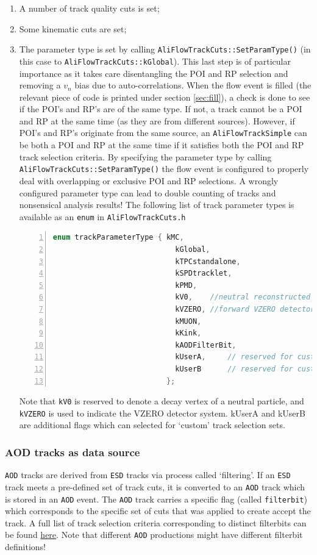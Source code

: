 \documentclass[a4paper]{book}
\numberwithin{equation}{subsection}
\begin{document}
\begin{enumerate}
\item A number of track quality cuts is set;
\item Some kinematic cuts are set;
\item The parameter type is set by calling \texttt{AliFlowTrackCuts::SetParamType()} (in this case to \texttt{AliFlowTrackCuts::kGlobal}). This last step is of particular importance as it takes care disentangling the POI and RP selection and removing a $v_n$ bias due to auto-correlations. When the flow event is filled (the relevant piece of code is printed under section \ref{sec:fill}), a check is done to see if the POI's and RP's are of the same type. If not, a track cannot be a POI and RP at the same time (as they are from different sources). However, if POI's and RP's originate from the same source, an \texttt{AliFlowTrackSimple} can be both a POI and RP at the same time if it satisfies both the POI and RP track selection criteria. By specifying the parameter type by calling \texttt{AliFlowTrackCuts::SetParamType()} the flow event is configured to properly deal with overlapping or exclusive POI and RP selections. A wrongly configured parameter type can lead to double counting of tracks and nonsensical analysis results! The following list of track parameter types is available as an \texttt{enum} in \texttt{AliFlowTrackCuts.h}
\begin{lstlisting}[language=C, numbers=left]
  enum trackParameterType { kMC, 
                            kGlobal, 
                            kTPCstandalone, 
                            kSPDtracklet,
                            kPMD,
                            kV0,    //neutral reconstructed v0 particle
                            kVZERO, //forward VZERO detector
                            kMUON,
                            kKink,
                            kAODFilterBit,
                            kUserA,     // reserved for custom cuts
                            kUserB      // reserved for custom cuts
                          };\end{lstlisting}
Note that \texttt{kV0} is reserved to denote a decay vertex of a neutral particle, and \texttt{kVZERO} is used to indicate the VZERO detector system. kUserA and kUserB are additional flags which can selected for `custom' track selection sets.
\end{enumerate}

\subsubsection{AOD tracks as data source}
\texttt{AOD} tracks are derived from \texttt{ESD} tracks via process called `filtering'. If an \texttt{ESD} track meets a pre-defined set of track cuts, it is converted to an \texttt{AOD} track which is stored in an \texttt{AOD} event. The \texttt{AOD} track carries a specific flag (called \texttt{filterbit}) which corresponds to the specific set of cuts that was applied to create accept the track. A full list of track selection criteria corresponding to distinct filterbits can be found \href{}{here}. Note that different \texttt{AOD} productions might have different filterbit definitions!
\end{document}
